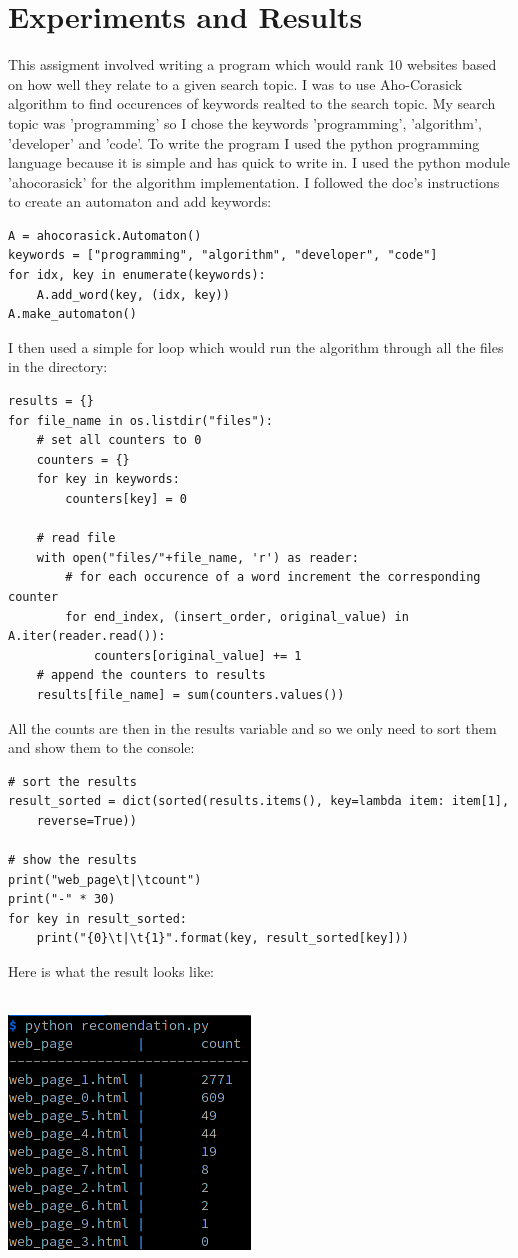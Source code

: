 \documentclass[]{article}
\newcommand\tab[1][1cm]{\hspace*{#1}}
\begin{document}
\section{Experiments and Results}
\tab This assigment involved writing a program which would rank 10 websites 
based on how well they relate to a given search topic. I was to use Aho-Corasick
algorithm to find occurences of keywords realted to the search topic.
My search topic was 'programming' so I chose the keywords 'programming', 'algorithm',
'developer' and 'code'.
To write the program I used the python programming language because it
is simple and has quick to write in. I used the python module 'ahocorasick'
for the algorithm implementation. I followed the doc's instructions to create
an automaton and add keywords:

\begin{lstlisting}[style=pythonStyle]
A = ahocorasick.Automaton()
keywords = ["programming", "algorithm", "developer", "code"]
for idx, key in enumerate(keywords):
	A.add_word(key, (idx, key))
A.make_automaton()
\end{lstlisting}


I then used a simple for loop which would run the algorithm through
all the files in the directory:

\begin{lstlisting}[style=pythonStyle]
results = {}
for file_name in os.listdir("files"):
	# set all counters to 0
	counters = {}
	for key in keywords:
		counters[key] = 0
	
	# read file
	with open("files/"+file_name, 'r') as reader:
		# for each occurence of a word increment the corresponding counter
		for end_index, (insert_order, original_value) in A.iter(reader.read()):
			counters[original_value] += 1
	# append the counters to results
	results[file_name] = sum(counters.values())
\end{lstlisting}


All the counts are then in the results variable and so we only need to 
sort them and show them to the console:

\begin{lstlisting}[style=pythonStyle]
# sort the results
result_sorted = dict(sorted(results.items(), key=lambda item: item[1],
	reverse=True))

# show the results
print("web_page\t|\tcount")
print("-" * 30)
for key in result_sorted:
	print("{0}\t|\t{1}".format(key, result_sorted[key]))
\end{lstlisting}

Here is what the result looks like:\\
\\
\begin{center}
	\includegraphics[scale=0.7]{res/recomendation.png}
\end{center}
\end{document}
